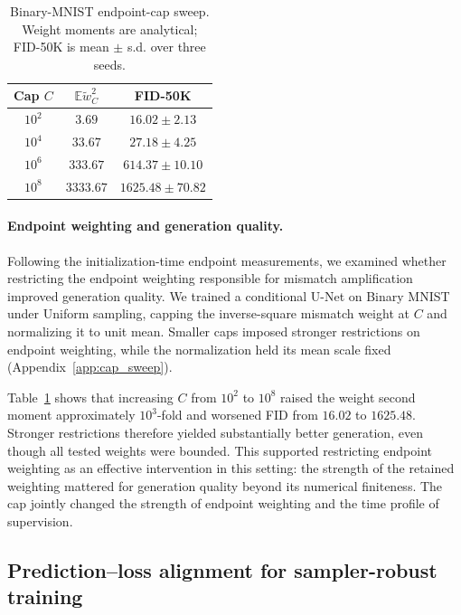 \documentclass{article}
\theoremstyle{plain}
\theoremstyle{definition}
\theoremstyle{remark}
\newcommand{\Ex}{\mathbb{E}}
\begin{document}
\begin{table}
\vspace{-0.5\baselineskip}
\centering
\caption{Binary-MNIST endpoint-cap sweep. Weight moments are analytical; FID-50K is mean $\pm$ s.d. over three seeds.}
\label{tab:bmnist_cap}
\small
\setlength{\tabcolsep}{4pt}
\begin{tabular}{ccc}
\toprule
Cap $C$ & $\Ex\widetilde w_C^2$ & FID-50K \\
\midrule
$10^2$ & $3.69$ & $16.02\pm2.13$ \\
$10^4$ & $33.67$ & $27.18\pm4.25$ \\
$10^6$ & $333.67$ & $614.37\pm10.10$ \\
$10^8$ & $3333.67$ & $1625.48\pm70.82$ \\
\bottomrule
\end{tabular}
\end{table}

\paragraph{Endpoint weighting and generation quality.}
Following the initialization-time endpoint measurements, we examined whether restricting the endpoint weighting responsible for mismatch amplification improved generation quality. We trained a conditional U-Net on Binary MNIST under Uniform sampling, capping the inverse-square mismatch weight at $C$ and normalizing it to unit mean. Smaller caps imposed stronger restrictions on endpoint weighting, while the normalization held its mean scale fixed (Appendix~\ref{app:cap_sweep}).

Table~\ref{tab:bmnist_cap} shows that increasing $C$ from $10^2$ to $10^8$ raised the weight second moment approximately $10^3$-fold and worsened FID from $16.02$ to $1625.48$. Stronger restrictions therefore yielded substantially better generation, even though all tested weights were bounded. This supported restricting endpoint weighting as an effective intervention in this setting: the strength of the retained weighting mattered for generation quality beyond its numerical finiteness. The cap jointly changed the strength of endpoint weighting and the time profile of supervision.
\WFclear

\subsection{Prediction--loss alignment for sampler-robust training}
\label{sec:empirical_robustness}
\end{document}
